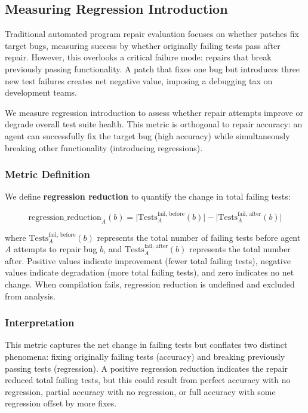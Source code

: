 \subsection{Measuring Regression Introduction}
\label{subsec:regression-analysis}

Traditional automated program repair evaluation focuses on whether patches fix target bugs, measuring success by whether originally failing tests pass after repair. However, this overlooks a critical failure mode: repairs that break previously passing functionality. A patch that fixes one bug but introduces three new test failures creates net negative value, imposing a debugging tax on development teams.

We measure regression introduction to assess whether repair attempts improve or degrade overall test suite health. This metric is orthogonal to repair accuracy: an agent can successfully fix the target bug (high accuracy) while simultaneously breaking other functionality (introducing regressions).

\subsubsection{Metric Definition}

We define \textbf{regression reduction} to quantify the change in total failing tests:

\begin{equation}
\text{regression\_reduction}_A(b) =
\big|\mathrm{Tests}^{\text{fail, before}}_A(b)\big| -
\big|\mathrm{Tests}^{\text{fail, after}}_A(b)\big|
\label{eq:regression-reduction}
\end{equation}

where $\mathrm{Tests}^{\text{fail, before}}_A(b)$ represents the total number of failing tests before agent $A$ attempts to repair bug $b$, and $\mathrm{Tests}^{\text{fail, after}}_A(b)$ represents the total number after. Positive values indicate improvement (fewer total failing tests), negative values indicate degradation (more total failing tests), and zero indicates no net change. When compilation fails, regression reduction is undefined and excluded from analysis.

\subsubsection{Interpretation}

This metric captures the net change in failing tests but conflates two distinct phenomena: fixing originally failing tests (accuracy) and breaking previously passing tests (regression). A positive regression reduction indicates the repair reduced total failing tests, but this could result from perfect accuracy with no regression, partial accuracy with no regression, or full accuracy with some regression offset by more fixes.

